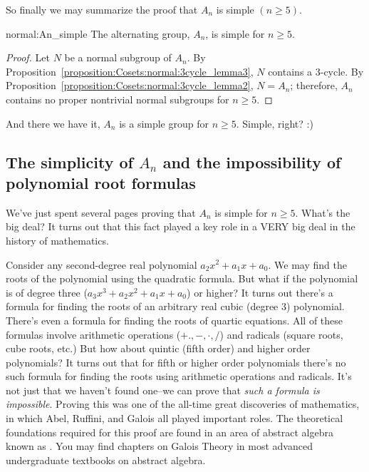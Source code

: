 So finally we may summarize the proof that $A_n$ is simple $(n \geq 5)$.

\begin{prop}{normal:An_simple}
The alternating group, $A_n$, is simple for $n \geq 5$. 
\end{prop}
 
\begin{proof}
Let $N$ be a normal subgroup of $A_n$. By Proposition~\ref{proposition:Cosets:normal:3cycle_lemma3}, $N$ contains a
3-cycle. By Proposition~\ref{proposition:Cosets:normal:3cycle_lemma2}, $N = A_n$; therefore, $A_n$ contains no proper
nontrivial normal subgroups for $n \geq 5$.
\end{proof} 
 
And there we have it, $A_n$ is a simple group for $n \geq 5$.  Simple, right? :)

\subsection{The simplicity of $A_n$ and the impossibility of polynomial root formulas}
\label{subsec:Cosets:FactoringSimpleGroups:ImpossiblePolynomialRootFormulas}

We've just spent several pages proving that $A_n$ is simple for $n \ge 5$.  What's the big deal? It turns out that this fact played a key role in a VERY big deal in the history of mathematics.

Consider any second-degree real polynomial $a_2x^2 + a_1x + a_0$.  We may find the roots of the polynomial using the quadratic formula.  But what if the polynomial is of degree three ($a_3x^3 + a_2x^2 + a_1x + a_0$) or higher?  It turns out there's a formula  for finding the roots of an arbitrary real cubic (degree 3) polynomial. There's even a formula for finding the roots of  quartic equations.  All of these formulas involve arithmetic operations ($+.,-,\cdot,/$) and radicals (square roots, cube roots, etc.)  But how about quintic (fifth order) and higher order polynomials?  It turns out that for fifth or higher order polynomials there's no such formula for finding the roots using arithmetic operations and radicals.  It's not just that we haven't found one--we can prove that \emph{such a formula is impossible}. Proving this was one of the all-time great discoveries of mathematics, in which Abel, Ruffini, and Galois all played important roles.  The theoretical foundations  required for this proof are found in an area of abstract algebra known as .  You may find chapters on Galois Theory in most advanced undergraduate textbooks on abstract algebra.

